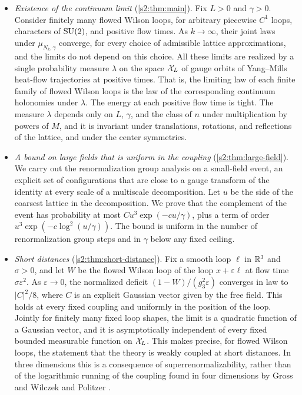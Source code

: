 \begin{itemize}
\item \emph{Existence of the continuum limit} (\cref{s2:thm:main}). Fix $L>0$ and $\gamma>0$. Consider finitely many flowed Wilson loops, for arbitrary piecewise $C^1$ loops, characters of $\mathrm{SU}(2)$, and positive flow times. As $k\to\infty$, their joint laws under $\mu_{N_k,\gamma}$ converge, for every choice of admissible lattice approximations, and the limits do not depend on this choice. All these limits are realized by a single probability measure $\lambda$ on the space $\mathcal X_L$ of gauge orbits of Yang--Mills heat-flow trajectories at positive times. That is, the limiting law of each finite family of flowed Wilson loops is the law of the corresponding continuum holonomies under $\lambda$. The energy at each positive flow time is tight. The measure $\lambda$ depends only on $L$, $\gamma$, and the class of $n$ under multiplication by powers of $M$, and it is invariant under translations, rotations, and reflections of the lattice, and under the center symmetries.
\item \emph{A bound on large fields that is uniform in the coupling} (\cref{s2:thm:large-field}). We carry out the renormalization group analysis on a small-field event, an explicit set of configurations that are close to a gauge transform of the identity at every scale of a multiscale decomposition. Let $u$ be the side of the coarsest lattice in the decomposition. We prove that the complement of the event has probability at most $Cu^3\exp(-cu/\gamma)$, plus a term of order $u^3\exp(-c\log^2(u/\gamma))$. The bound is uniform in the number of renormalization group steps and in $\gamma$ below any fixed ceiling.
\item \emph{Short distances} (\cref{s2:thm:short-distance}). Fix a smooth loop $\ell$ in $\mathbb R^3$ and $\sigma>0$, and let $W$ be the flowed Wilson loop of the loop $x+\varepsilon\ell$ at flow time $\sigma\varepsilon^2$. As $\varepsilon\to0$, the normalized deficit $(1-W)/(g_3^2\varepsilon)$ converges in law to $|C|^2/8$, where $C$ is an explicit Gaussian vector given by the free field. This holds at every fixed coupling and uniformly in the position of the loop. Jointly for finitely many fixed loop shapes, the limit is a quadratic function of a Gaussian vector, and it is asymptotically independent of every fixed bounded measurable function on $\mathcal X_L$. This makes precise, for flowed Wilson loops, the statement that the theory is weakly coupled at short distances. In three dimensions this is a consequence of superrenormalizability, rather than of the logarithmic running of the coupling found in four dimensions by Gross and Wilczek \cite{GrossWilczek1973} and Politzer \cite{Politzer1973}.

\end{itemize}

